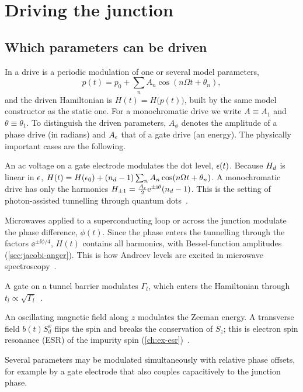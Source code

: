 \chapter{Driving the junction}\label{ch:driving}

\section{Which parameters can be driven}\label{sec:drives}

In \pkg{} a drive is a periodic modulation of one or several model parameters,
\begin{equation}\label{eq:drive}
  p(t)=p_0+\sum_n A_n\cos(n\Omega t+\theta_n),
\end{equation}
and the driven Hamiltonian is $H(t)=H\bigl(p(t)\bigr)$, built by the same model
constructor as the static one. For a monochromatic drive we write $A\equiv A_1$ and
$\theta\equiv\theta_1$. To distinguish the driven parameters, $A_\phi$ denotes the amplitude
of a phase drive (in radians) and $A_\epsilon$ that of a gate drive (an energy). The physically
important cases are the following.

\begin{description}[leftmargin=0pt]
\item[Gate drive.] An ac voltage on a gate electrode modulates the dot level,
$\epsilon(t)$. Because $H_{d}$ is linear in $\epsilon$, $H(t)=H(\epsilon_0)+(n_d-1)\sum_nA_n\cos(n\Omega
t+\theta_n)$. A monochromatic drive has only the harmonics
$H_{\pm1}=\tfrac{A_\epsilon}2\mathrm{e}^{\pm\mathrm{i}\theta}(n_d-1)$.
This is the setting of photon-assisted tunnelling through quantum
dots~\cite{kouwenhoven1994photon,kouwenhoven1994observation,oosterkamp1998microwave,platero2004photon}.
\item[Phase drive.] Microwaves applied to a superconducting loop or across the junction
modulate the phase difference, $\phi(t)$. Since the phase enters the tunnelling through
the factors $\ee^{\pm\ii\phi/4}$, $H(t)$ contains all harmonics, with Bessel-function
amplitudes (\cref{sec:jacobi-anger}). This is how Andreev levels are
excited in microwave spectroscopy~\cite{bretheau2013exciting,janvier2015coherent,hays2018direct,kos2013frequencydependent}.
\item[Coupling drive.] A gate on a tunnel barrier modulates $\Gamma_l$, which enters the
Hamiltonian through $t_l\propto\sqrt{\Gamma_l}$~\cite{moghaddam2012driven}.
\item[Field drive.] An oscillating magnetic field along $z$ modulates the Zeeman energy. A
transverse field $b(t)S^x_d$ flips the spin and breaks the conservation of $S_z$; this is
electron spin resonance (ESR) of the impurity spin
(\cref{ch:ex-esr})~\cite{koppens2006driven,baumann2015electron,yang2019coherent}.
\item[Combined drives.] Several parameters may be modulated simultaneously with relative
phase offsets, for example by a gate electrode that also couples capacitively to the junction phase.
\end{description}

